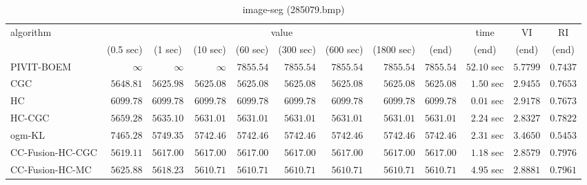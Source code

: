 \begin{table}[H]
\scriptsize
\centering
\caption{image-seg (285079.bmp)}
\label{tab:anytimetable-image-seg-285079.bmp}
\begin{tabular}{lrrrrrrrrrrr}
\toprule
           algorithm &                                   \multicolumn{8}{c}{value} & \multicolumn{1}{c}{time}    & \multicolumn{1}{c}{VI}  & \multicolumn{1}{c}{RI} \\  
\cmidrule(lr){2-9}\cmidrule(lr){10-10} \cmidrule(lr){11-11} \cmidrule(lr){12-12}   
                     & \multicolumn{1}{c}{(0.5 sec)} & \multicolumn{1}{c}{(1 sec)} & \multicolumn{1}{c}{(10 sec)} & \multicolumn{1}{c}{(60 sec)} & \multicolumn{1}{c}{(300 sec)} & \multicolumn{1}{c}{(600 sec)} & \multicolumn{1}{c}{(1800 sec)} & \multicolumn{1}{c}{(end)} & \multicolumn{1}{c}{(end)}    & \multicolumn{1}{c}{(end)}   & \multicolumn{1}{c}{(end)}  \\ \midrule 
          PIVIT-BOEM & $\infty$ & $\infty$ & $\infty$ & $      7855.54$ & $      7855.54$ & $      7855.54$ & $      7855.54$ & $      7855.54$ & $        52.10$ sec    & $       5.7799$  & $       0.7437$ \\ 
                 CGC & $      5648.81$ & $      5625.98$ & $      5625.08$ & $      5625.08$ & $      5625.08$ & $      5625.08$ & $      5625.08$ & $      5625.08$ & $         1.50$ sec    & $       2.9455$  & $       0.7653$ \\ 
                  HC & $      6099.78$ & $      6099.78$ & $      6099.78$ & $      6099.78$ & $      6099.78$ & $      6099.78$ & $      6099.78$ & $      6099.78$ & $         0.01$ sec    & $       2.9178$  & $       0.7673$ \\ 
              HC-CGC & $      5659.28$ & $      5635.10$ & $      5631.01$ & $      5631.01$ & $      5631.01$ & $      5631.01$ & $      5631.01$ & $      5631.01$ & $         2.24$ sec    & $       2.8327$  & $       0.7822$ \\ 
              ogm-KL & $      7465.28$ & $      5749.35$ & $      5742.46$ & $      5742.46$ & $      5742.46$ & $      5742.46$ & $      5742.46$ & $      5742.46$ & $         2.31$ sec    & $       3.4650$  & $       0.5453$ \\ 
    CC-Fusion-HC-CGC & $      5619.11$ & $      5617.00$ & $      5617.00$ & $      5617.00$ & $      5617.00$ & $      5617.00$ & $      5617.00$ & $      5617.00$ & $         1.18$ sec    & $       2.8579$  & $       0.7976$ \\ 
     CC-Fusion-HC-MC & $      5625.88$ & $      5618.23$ & $      5610.71$ & $      5610.71$ & $      5610.71$ & $      5610.71$ & $      5610.71$ & $      5610.71$ & $         4.95$ sec    & $       2.8881$  & $       0.7961$ \\ 

\end{tabular}
\end{table}
